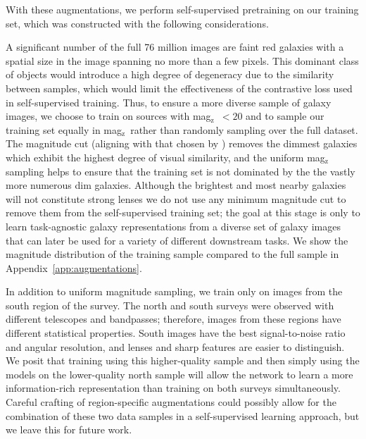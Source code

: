 \documentclass{aastex631}
\newcommand{\zmag}{mag$_{\mathrm{z}}$}
\begin{document}
With these augmentations, we perform self-supervised pretraining on our training set, which was constructed with the following considerations.

A significant number of the full 76 million images are faint red galaxies with a spatial size in the image spanning no more than a few pixels. This dominant class of objects would introduce a high degree of degeneracy due to the similarity between samples, which would limit the effectiveness of the contrastive loss used in self-supervised training. Thus, to ensure a more diverse sample of galaxy images, we choose to train on sources with \zmag~$<20$ and to sample our training set equally in \zmag~rather than randomly sampling over the full dataset. The magnitude cut (aligning with that chosen by \citep{HuangI}) removes the dimmest galaxies which exhibit the highest degree of visual similarity, and the uniform \zmag sampling helps to ensure that the training set is not dominated by the the vastly more numerous dim galaxies. Although the brightest and most nearby galaxies will not constitute strong lenses we do not use any minimum magnitude cut to remove them from the self-supervised training set; the goal at this stage is only to learn task-agnostic galaxy representations from a diverse set of galaxy images that can later be used for a variety of different downstream tasks. We show the magnitude distribution of the training sample compared to the full sample in Appendix~\ref{app:augmentations}.

In addition to uniform magnitude sampling, we train only on images from the south region of the survey. The north and south surveys were observed with different telescopes and bandpasses; therefore, images from these regions have different statistical properties. South images have the best signal-to-noise ratio and angular resolution, and  lenses and sharp features are easier to distinguish. We posit that training using this higher-quality sample and then simply using the models on the lower-quality north sample will allow the network to learn a more information-rich representation than training on both surveys simultaneously. Careful crafting of region-specific augmentations could possibly allow for the combination of these two data samples in a self-supervised learning approach, but we leave this for future work.  
\end{document}
